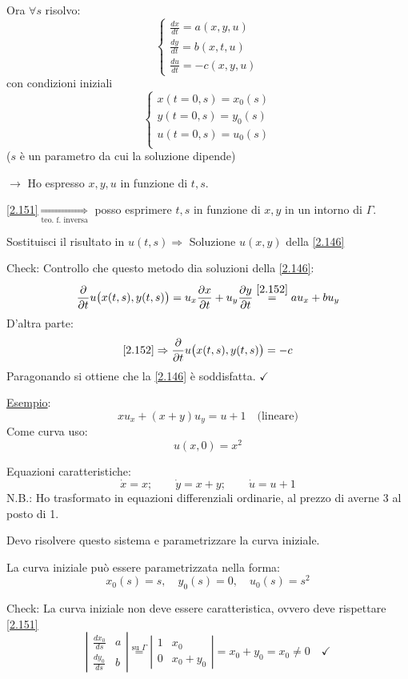 \documentclass[a4paper,11pt]{report}
\begin{document}
Ora $\forall s$ risolvo: 
\begin{equation}
\begin{cases}
\frac{dx}{dt}=a(x,y,u) \\
\frac{dy}{dt}=b(x,t,u) \\
\frac{du}{dt}=-c(x,y,u)
\end{cases}
\label{2.152}
\end{equation}
con condizioni iniziali
\begin{equation}
\begin{cases}
x(t=0,s)=x_0(s) \\
y(t=0,s)=y_0(s) \\
u(t=0,s)=u_0(s) \\
\end{cases}
\label{2.153}
\end{equation}
($s$ \`e un parametro da cui la soluzione dipende)

$\rightarrow$ Ho espresso $x,y,u$ in funzione di $t,s$.

\smallskip

\eqref{2.151}$\underset{\text{teo. f. inversa}}{\Rightarrow}$ posso esprimere $t,s$ in funzione di $x,y$ in un intorno di $\Gamma$.

Sostituisci il risultato in $u(t,s)\Rightarrow$ Soluzione $u(x,y)$ della \eqref{2.146}

\medskip

Check: Controllo che questo metodo dia soluzioni della \eqref{2.146}:
\[
\frac{\partial}{\partial t}u \big(x(t,s),y(t,s) \big)=u_x \frac{\partial x}{\partial t} + u_y \frac{\partial y}{\partial t}\overset{\eqref{2.152}}{=}au_x + bu_y
\]
D'altra parte:
\[
\eqref{2.152} \Rightarrow  \frac{\partial }{\partial t} u\big( x(t,s),y(t,s) \big)=-c
\]
Paragonando si ottiene che la \eqref{2.146} \`e soddisfatta. $\checkmark$

\medskip

\underline{Esempio}:
\[
xu_x + (x+y)u_y = u+1\quad \text{(lineare)}
\]
Come curva uso:
\[
u(x,0)=x^2
\]

Equazioni caratteristiche:
\[
\dot{x}=x; \qquad \dot{y}=x+y; \qquad \dot{u}=u+1
\]
N.B.: Ho trasformato in equazioni differenziali ordinarie, al prezzo di averne 3 al posto di 1.

Devo risolvere questo sistema e parametrizzare la curva iniziale.

La curva iniziale pu\`o essere parametrizzata nella forma:
\[
x_0(s)=s,\quad y_0(s)=0,\quad u_0(s)=s^2
\]

Check: La curva iniziale non deve essere caratteristica, ovvero deve rispettare \eqref{2.151}
\[
\left|\begin{matrix}
\frac{dx_0}{ds} & a \\
\frac{dy_0}{ds} & b
\end{matrix}\right| \overset{\text{su }\Gamma}{=} \left| \begin{matrix}
1 & x_0 \\
0 & x_0+y_0
\end{matrix} \right| = x_0 + y_0 = x_0 \neq 0 \quad \checkmark
\]
\end{document}
